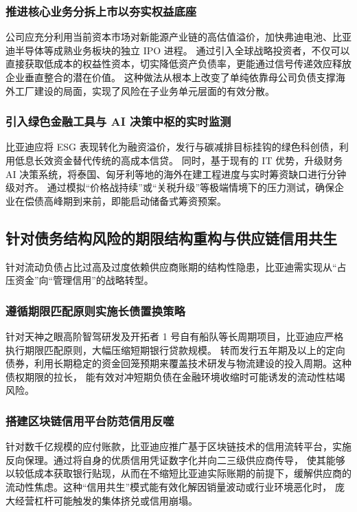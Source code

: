 \documentclass[12pt,a4paper,fontset=windows,UTF8]{ctexart}
\begin{document}
\subsubsection{推进核心业务分拆上市以夯实权益底座}

公司应充分利用当前资本市场对新能源产业链的高估值溢价，加快弗迪电池、比亚迪半导体等成熟业务板块的独立 IPO 进程。
  通过引入全球战略投资者，不仅可以直接获取低成本的权益性资本，切实降低资产负债率，更能通过信号传递效应释放企业垂直整合的潜在价值。
  这种做法从根本上改变了单纯依靠母公司负债支撑海外工厂建设的局面，实现了风险在子业务单元层面的有效分散。

\subsubsection{引入绿色金融工具与 AI 决策中枢的实时监测}

比亚迪应将 ESG 表现转化为融资溢价，发行与碳减排目标挂钩的绿色科创债，利用低息长效资金替代传统的高成本信贷。
  同时，基于现有的 IT 优势，升级财务 AI 决策系统，将泰国、匈牙利等地的海外在建工程进度与实时筹资缺口进行分钟级对齐。
  通过模拟“价格战持续”或“关税升级”等极端情境下的压力测试，确保企业在偿债高峰期到来前，即能启动储备式筹资预案。

\subsection{针对债务结构风险的期限结构重构与供应链信用共生}

针对流动负债占比过高及过度依赖供应商账期的结构性隐患，比亚迪需实现从“占压资金”向“管理信用”的战略转型。

\subsubsection{遵循期限匹配原则实施长债置换策略}

针对天神之眼高阶智驾研发及开拓者 1 号自有船队等长周期项目，比亚迪应严格执行期限匹配原则，大幅压缩短期银行贷款规模。
  转而发行五年期及以上的定向债券，利用长期稳定的资金回笼预期来覆盖技术研发与物流建设的投入周期。这种债权期限的拉长，
  能有效对冲短期负债在金融环境收缩时可能诱发的流动性枯竭风险。

\subsubsection{搭建区块链信用平台防范信用反噬}

针对数千亿规模的应付账款，比亚迪应推广基于区块链技术的信用流转平台，实施反向保理。通过将自身的优质信用凭证数字化并向二三级供应商传导，
  使其能够以较低成本获取银行贴现，从而在不缩短比亚迪实际账期的前提下，缓解供应商的流动性焦虑。这种“信用共生”模式能有效化解因销量波动或行业环境恶化时，
  庞大经营杠杆可能触发的集体挤兑或信用崩塌。
\end{document}
